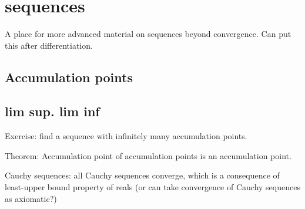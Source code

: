 \section{sequences}

A place for more advanced material on sequences beyond convergence. Can put this after differentiation.

\subsection{Accumulation points}

\subsection{lim sup. lim inf}

Exercise: find a sequence with infinitely many accumulation points. 

Theorem: Accumulation point of accumulation points is an accumulation point.

Cauchy sequences: all Cauchy sequences converge, which is a consequence of least-upper bound property of reals (or can take convergence of Cauchy sequences as axiomatic?)